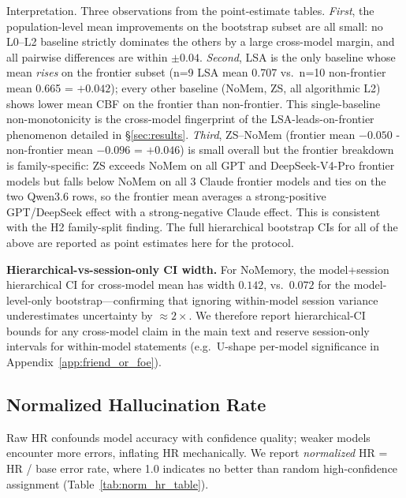 \documentclass[11pt]{article}
\begin{document}
Interpretation. Three observations from the point-estimate tables. \emph{First}, the population-level mean improvements on the bootstrap subset are all small: no L0--L2 baseline strictly dominates the others by a large cross-model margin, and all pairwise differences are within $\pm 0.04$. \emph{Second}, LSA is the only baseline whose mean \emph{rises} on the frontier subset (n=9 LSA mean 0.707 vs.\ n=10 non-frontier mean 0.665 = $+0.042$); every other baseline (NoMem, ZS, all algorithmic L2) shows lower mean CBF on the frontier than non-frontier. This single-baseline non-monotonicity is the cross-model fingerprint of the LSA-leads-on-frontier phenomenon detailed in \S\ref{sec:results}. \emph{Third}, ZS--NoMem (frontier mean $-0.050$ - non-frontier mean $-0.096$ = $+0.046$) is small overall but the frontier breakdown is family-specific: ZS exceeds NoMem on all GPT and DeepSeek-V4-Pro frontier models but falls below NoMem on all 3 Claude frontier models and ties on the two Qwen3.6 rows, so the frontier mean averages a strong-positive GPT/DeepSeek effect with a strong-negative Claude effect. This is consistent with the H2 family-split finding. The full hierarchical bootstrap CIs for all of the above are reported as point estimates here for the protocol.

\textbf{Hierarchical-vs-session-only CI width.} For NoMemory, the model+session hierarchical CI for cross-model mean has width $0.142$, vs.\ $0.072$ for the model-level-only bootstrap---confirming that ignoring within-model session variance underestimates uncertainty by $\approx\!2\times$. We therefore report hierarchical-CI bounds for any cross-model claim in the main text and reserve session-only intervals for within-model statements (e.g.\ U-shape per-model significance in Appendix~\ref{app:friend_or_foe}).



\subsection{Normalized Hallucination Rate}
\label{app:norm_hr}

Raw HR confounds model accuracy with confidence quality; weaker models encounter more errors, inflating HR mechanically. We report \emph{normalized} HR = HR / base error rate, where 1.0 indicates no better than random high-confidence assignment (Table~\ref{tab:norm_hr_table}).
\end{document}
